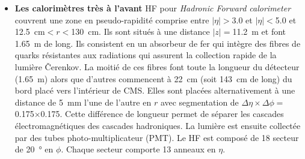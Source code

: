 \begin{itemize}[label=$\bullet$]
	numérotés $-$\num{2}, $-$\num{1}, \num{0}, $+$\num{1}, $+$\num{2} et de centre $z=-$\num{5.324}, \num{2.686}, \num{0}, \num{2.686} et \SI{5.324}{\meter} respectivement. Le premier anneau est composé de deux couches de scintillateurs de \SI{10}{\milli\meter} d'épaisseur placées en $r=$\SI{3.82}{\meter} et \SI{4.07}{\meter}. Les autres anneaux ne possèdent qu'une couche de scintillateur placé à $r=$\SI{4.07}{\meter}. Chaque anneau est segmenté en \num{12} secteurs en $\phi$. Et chaque secteur est segmenté en \num{8}, \num{6} et \num{5} tuiles de scintillateurs (cf.Fig~\ref{SCINTI}) pour les anneaux \num{0}, $\pm$\num{1}, $\pm$\num{2} respectivement.
	\item \textbf{Les calorimètres très à l'avant} HF pour \textit{Hadronic Forward calorimeter} couvrent une zone en pseudo-rapidité comprise entre $|\eta|>$\num{3.0} et $|\eta|<$\num{5.0} et \SI{12.5}{\centi\meter}$<r<$\SI{130}{\centi\meter}. Ils sont situés à une distance $|z|=$\SI{11.2}{\meter} et font \SI{1.65}{\meter} de long. Ils consistent en un absorbeur de fer qui intègre des fibres de quarks résistantes aux radiations qui assurent la collection rapide de la lumière Čerenkov. La moitié de ces fibres font toute la longueur du détecteur (\SI{1.65}{\meter}) alors que d'autres commencent à \SI{22}{\centi\meter} (soit \SI{143}{\centi\meter} de long) du bord placé vers l'intérieur de CMS. Elles sont placées alternativement à une distance de \SI{5}{\milli\meter} l'une de l'autre en $r$  avec segmentation de $\Delta\eta\times\Delta\phi=$\num{0.175}$\times$\num{0.175}. Cette différence de longueur permet de séparer les cascades électromagnétiques des cascades hadroniques. La lumière est ensuite collectée par des tubes photo-multiplicateur (PMT). Le HF est composé de \num{18} secteur de \SI{20}{\degree} en $\phi$. Chaque secteur comporte \num{13} anneaux en $\eta$.
\end{itemize}
